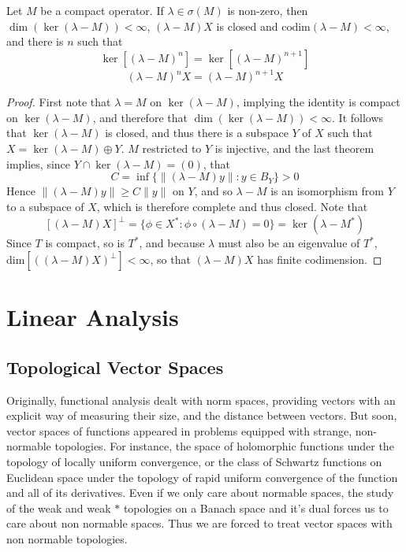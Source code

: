 \begin{corollary}
    Let $M$ be a compact operator. If $\lambda \in \sigma(M)$ is non-zero, then $\dim(\ker(\lambda - M)) < \infty$, $(\lambda - M)X$ is closed and $\text{codim}(\lambda - M) < \infty$, and there is $n$ such that
    \[ \ker[(\lambda - M)^n] = \ker[(\lambda - M)^{n+1}] \]
    \[ (\lambda - M)^n X = (\lambda - M)^{n+1} X \]
\end{corollary}
\begin{proof}
    First note that $\lambda = M$ on $\ker(\lambda - M)$, implying the identity is compact on $\ker(\lambda - M)$, and therefore that $\dim(\ker(\lambda - M)) < \infty$. It follows that $\ker(\lambda - M)$ is closed, and thus there is a subspace $Y$ of $X$ such that $X = \ker(\lambda - M) \oplus Y$. $M$ restricted to $Y$ is injective, and the last theorem implies, since $Y \cap \ker(\lambda - M) = (0)$, that
    \[ C = \inf \{ \| (\lambda - M)y \| : y \in B_Y \} > 0 \]
    Hence $\| (\lambda - M)y \| \geq C \|y\|$ on $Y$, and so $\lambda - M$ is an isomorphism from $Y$ to a subspace of $X$, which is therefore complete and thus closed. Note that
    \[ [(\lambda - M)X]^\perp = \{ \phi \in X^*: \phi \circ (\lambda - M) = 0 \} = \ker( \lambda - M^*) \]
    Since $T$ is compact, so is $T^*$, and because $\lambda$ must also be an eigenvalue of $T^*$, $\text{dim}[((\lambda - M)X)^\perp] < \infty$, so that $(\lambda - M)X$ has finite codimension.
\end{proof}









\part{Linear Analysis}

\chapter{Topological Vector Spaces}

Originally, functional analysis dealt with norm spaces, providing vectors with an explicit way of measuring their size, and the distance between vectors. But soon, vector spaces of functions appeared in problems equipped with strange, non-normable topologies. For instance, the space of holomorphic functions under the topology of locally uniform convergence, or the class of Schwartz functions on Euclidean space under the topology of rapid uniform convergence of the function and all of its derivatives. Even if we only care about normable spaces, the study of the weak and weak $*$ topologies on a Banach space and it's dual forces us to care about non normable spaces. Thus we are forced to treat vector spaces with non normable topologies.

